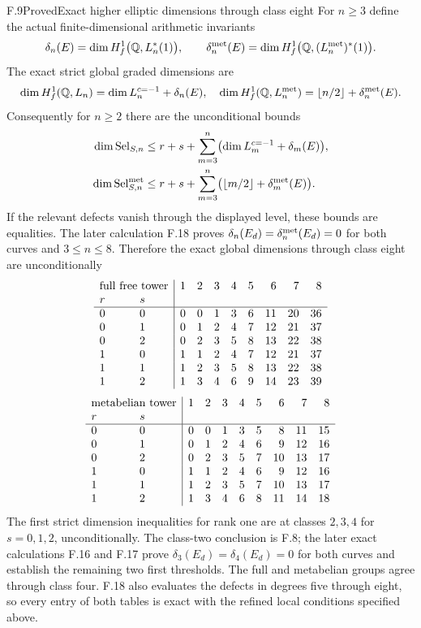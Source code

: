 \begin{statement}{F.9}{Proved}{Exact higher elliptic dimensions through class eight}
For $n\ge3$ define the actual finite-dimensional arithmetic invariants
\[
 \delta_n(E)=\dim H_f^1\bigl(\mathbb Q,L_n^*(1)\bigr),\qquad
 \delta_n^{\rm met}(E)=
       \dim H_f^1\bigl(\mathbb Q,(L_n^{\rm met})^*(1)\bigr).
\]
The exact strict global graded dimensions are
\[
 \dim H_f^1(\mathbb Q,L_n)=\dim L_n^{c=-1}+\delta_n(E),
 \quad
 \dim H_f^1(\mathbb Q,L_n^{\rm met})
       =\lfloor n/2\rfloor+\delta_n^{\rm met}(E).
\]
Consequently for $n\ge2$ there are the unconditional bounds
\[
 \begin{split}
 \dim\operatorname{Sel}_{S,n}
   &\le r+s+\sum_{m=3}^n\bigl(\dim L_m^{c=-1}+\delta_m(E)\bigr),\\
 \dim\operatorname{Sel}^{\rm met}_{S,n}
   &\le r+s+\sum_{m=3}^n
           \bigl(\lfloor m/2\rfloor+\delta_m^{\rm met}(E)\bigr).
 \end{split}
\]
If the relevant defects vanish through the displayed level, these
bounds are equalities. The later calculation F.18 proves
$\delta_n(E_d)=\delta_n^{\rm met}(E_d)=0$ for both curves and
$3\le n\le8$. Therefore the exact global dimensions through
class eight are unconditionally
\[
\begin{array}{cc|rrrrrrrr}
 \multicolumn{2}{c|}{\text{full free tower}}&1&2&3&4&5&6&7&8\\
 r&s&&&&&&&&\\\hline
 0&0&0&0&1&3&6&11&20&36\\
 0&1&0&1&2&4&7&12&21&37\\
 0&2&0&2&3&5&8&13&22&38\\
 1&0&1&1&2&4&7&12&21&37\\
 1&1&1&2&3&5&8&13&22&38\\
 1&2&1&3&4&6&9&14&23&39
\end{array}
\]
\[
\begin{array}{cc|rrrrrrrr}
 \multicolumn{2}{c|}{\text{metabelian tower}}&1&2&3&4&5&6&7&8\\
 r&s&&&&&&&&\\\hline
 0&0&0&0&1&3&5&8&11&15\\
 0&1&0&1&2&4&6&9&12&16\\
 0&2&0&2&3&5&7&10&13&17\\
 1&0&1&1&2&4&6&9&12&16\\
 1&1&1&2&3&5&7&10&13&17\\
 1&2&1&3&4&6&8&11&14&18
\end{array}
\]
The first strict dimension inequalities for rank one are at classes
$2,3,4$ for $s=0,1,2$, unconditionally. The class-two conclusion
is F.8; the later exact calculations F.16 and F.17 prove
$\delta_3(E_d)=\delta_4(E_d)=0$ for both curves and establish
the remaining two first thresholds. The full and metabelian groups
agree through class four. F.18 also evaluates the defects in
degrees five through eight, so every entry of both tables is exact
with the refined local conditions specified above.
\end{statement}
